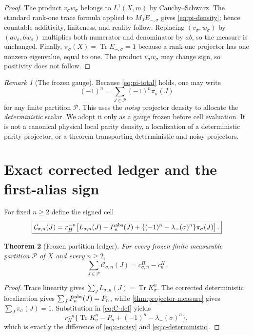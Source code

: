\documentclass[11pt]{article}
\newtheorem{theorem}{Theorem}[section]
\theoremstyle{remark}
\newtheorem{remark}[theorem]{Remark}
\newcommand{\Tr}{\operatorname{Tr}}
\newcommand{\cC}{\mathcal C}
\newcommand{\cP}{\mathcal P}
\begin{document}
\begin{proof}
The product $v_\sigma w_\sigma$ belongs to $L^1(X,m)$ by Cauchy--Schwarz.
The standard rank-one trace formula applied to $M_JE_{-,\sigma}$ gives
\eqref{eq:pi-density}; hence countable additivity, finiteness, and reality
follow.  Replacing $(v_\sigma,w_\sigma)$ by
$(av_\sigma,bw_\sigma)$ multiplies both numerator and denominator by $ab$,
so the measure is unchanged.  Finally,
$\pi_\sigma(X)=\Tr E_{-,\sigma}=1$ because a rank-one projector has one
nonzero eigenvalue, equal to one.  The product
$v_\sigma w_\sigma$ may change sign, so positivity does not follow.
\end{proof}

\begin{remark}[The frozen gauge]\label{rem:frozen-gauge}
Because \eqref{eq:pi-total} holds, one may write
\[
 (-1)^n=\sum_{J\in\cP}(-1)^n\pi_\sigma(J)
\]
for any finite partition $\cP$.  This uses the \emph{noisy} projector
density to allocate the \emph{deterministic} scalar.  We adopt it only as a
gauge frozen before cell evaluation.  It is not a canonical physical local
parity density, a localization of a deterministic parity projector, or a
theorem transporting deterministic and noisy projectors.
\end{remark}

\section{Exact corrected ledger and the first-alias sign}

For fixed $n\ge2$ define the signed cell
\begin{equation}\label{eq:C-def}
 \boxed{
 \cC_{\sigma,n}(J)=r_H^{-n}\!\left[
 L_{\sigma,n}(J)-P_n^{\rm abs}(J)
 +\{(-1)^n-\lambda_-(\sigma)^n\}\pi_\sigma(J)
 \right].}
\end{equation}

\begin{theorem}[Frozen partition ledger]\label{thm:partition-ledger}
For every frozen finite measurable partition $\cP$ of $X$ and every
$n\ge2$,
\begin{equation}\label{eq:partition-ledger}
 \boxed{
 \sum_{J\in\cP}\cC_{\sigma,n}(J)
 =c^H_{\sigma,n}-c^H_n.}
\end{equation}
\end{theorem}

\begin{proof}
Trace linearity gives
$\sum_JL_{\sigma,n}(J)=\Tr K_\sigma^n$.  The corrected deterministic
localization gives $\sum_JP_n^{\rm abs}(J)=P_n$, while
\cref{thm:projector-measure} gives $\sum_J\pi_\sigma(J)=1$.
Substitution in \eqref{eq:C-def} yields
\[
 r_H^{-n}\{\Tr K_\sigma^n-P_n+(-1)^n-\lambda_-(\sigma)^n\},
\]
which is exactly the difference of \eqref{eq:c-noisy} and
\eqref{eq:c-deterministic}.
\end{proof}
\end{document}
